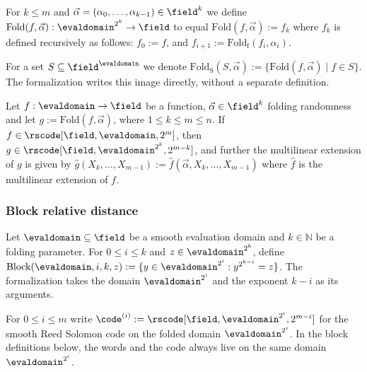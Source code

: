 \begin{definition}\label{def:fold_k}
\leanok
{}
    For $k \leq m$ and $\vec{\alpha} = (\alpha_0, \ldots, \alpha_{k-1}) \in \field^k$ we define $\mathrm{Fold}(f, \vec{\alpha}) : \evaldomain^{2^k} \to \field$ to equal $\mathrm{Fold}(f, \vec{\alpha}) := f_k$ where $f_k$ is defined recursively as follows: $f_0 := f$, and $f_{i+1} := \mathrm{Fold_f}(f_{i}, \alpha_i)$.
\end{definition}

\begin{definition}\label{def:fold_k_set}
    For a set $S \subseteq \field^{\evaldomain}$ we denote $\mathrm{Fold_{S}}(S, \vec{\alpha}) := \{\mathrm{Fold}(f, \vec{\alpha}) \mid f \in S\}$.
    The formalization writes this image directly, without a separate definition.
\end{definition}

\begin{lemma}\label{lemma:fold_fg}
\leanok
{}
    Let $f : \evaldomain \to \field$ be a function, $\vec{\alpha} \in \field^k$ folding randomness and let $g := \mathrm{Fold}(f, \vec{\alpha})$, where $1\le k \leq m\le n$. If $f \in \rscode[\field, \evaldomain, 2^m]$, then $g \in \rscode[\field, \evaldomain^{2^k}, 2^{m - k}]$, and further the multilinear extension of $g$ is given by $\hat{g}(X_k, \ldots, X_{m-1}) := \hat{f}(\vec{\alpha}, X_k, \ldots, X_{m-1})$ where $\hat{f}$ is the multilinear extension of $f$.
\end{lemma}

\subsubsection{Block relative distance}

\begin{definition}\label{def:block}
\leanok
    Let $\evaldomain \subseteq \field$ be a smooth evaluation domain and $k \in \mathbb{N}$ be a folding parameter. For $0\le i\le k$ and $z \in \evaldomain^{2^k}$, define $\mathrm{Block}(\evaldomain, i, k, z) := \{ y \in \evaldomain^{2^i} : y^{2^{k-i}} = z \}$.
    The formalization takes the domain $\evaldomain^{2^i}$ and the exponent $k-i$ as its arguments.
\end{definition}

For $0\le i\le m$ write $\code^{(i)} := \rscode[\field, \evaldomain^{2^i}, 2^{m-i}]$ for the smooth
Reed Solomon code on the folded domain $\evaldomain^{2^i}$. In the block definitions below, the
words and the code always live on the same domain $\evaldomain^{2^i}$.


